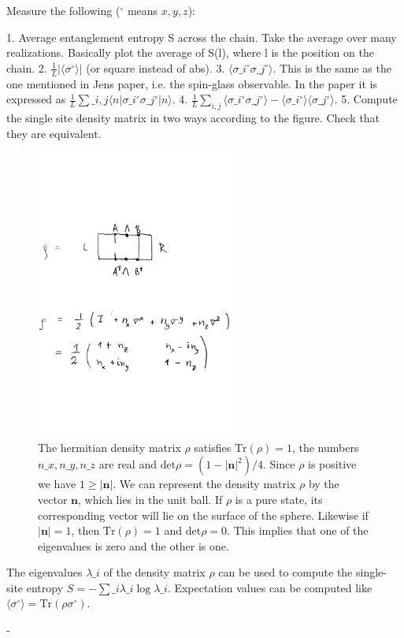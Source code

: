 \documentclass[a4paper]{article}
\begin{document}
\begin{markdown}
	
	 Measure the following ($^\circ$ means $x,y,z$):
	 
	1. Average entanglement entropy S across the chain. Take the average over many realizations. Basically plot the average of S(l), where l is the position on the chain.
	2. $\frac{1}{L}|\langle \sigma^\circ \rangle|$ (or square instead of abs).
	3. $\langle\sigma\_i^\circ\sigma\_j^\circ \rangle$. This is the same as the one mentioned in Jens paper, i.e. the spin-glass observable. In the paper it is expressed as $\frac{1}{L} \sum\_{i,j} \langle n | \sigma\_i^\circ \sigma\_j^\circ | n \rangle $.
	4. $\frac{1}{L}\sum_{i,j} \langle  \sigma\_i^\circ \sigma\_j^\circ \rangle - \langle \sigma\_i^\circ \rangle \langle\sigma\_j^\circ \rangle $.
	5. Compute the single site density matrix in two ways according to the figure. Check that they are equivalent.
	\begin{figure}[h!]
		\centering
		\includegraphics[width=0.6\textwidth]{figures/densitymatrix.pdf}
		\caption{The hermitian density matrix $\rho$ satisfies $\mathrm{Tr}(\rho) = 1$, the numbers $n\_x,n\_y,n\_z$ are real and $\mathrm{det}\rho = (1-|\mathbf{n}|^2)/4$. Since $\rho$ is positive we have $1\geq |\mathbf{n}|$. We can represent the density matrix $\rho$ by the vector $\mathbf{n}$, which lies in the unit ball. If $\rho$ is a pure state, its corresponding vector will lie on the surface of the sphere. Likewise if $|\mathbf{n}|=1$, then $\mathrm{Tr}(\rho) = 1$ and $\mathrm{det} \rho = 0$. This implies that one of the eigenvalues is zero and the other is one.}
	\end{figure}
		The eigenvalues $\lambda\_i$ of the density matrix $\rho$ can be used to compute the single-site entropy $S = -\sum\_i \lambda\_i \log \lambda\_i$.  Expectation values can be computed like $\langle \sigma^\circ \rangle = \mathrm{Tr}(\rho\sigma^\circ)$.

	- 
\end{markdown}
\end{document}
